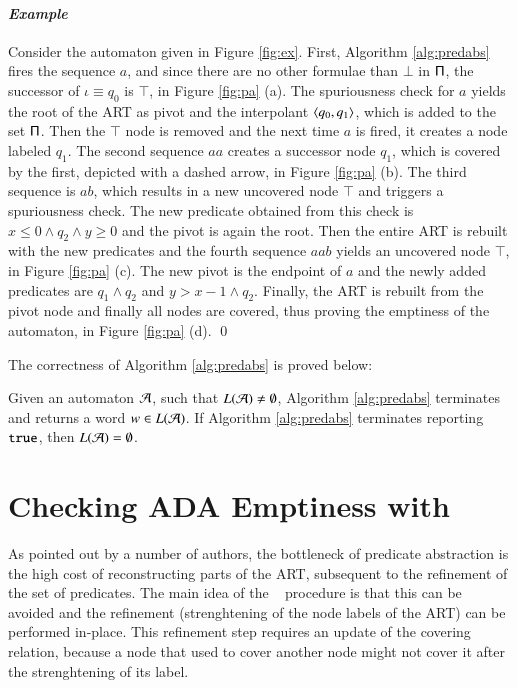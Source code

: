 \documentclass[10pt,conference,letterpaper,twocolumn]{IEEEtran}
\begin{document}
\paragraph{\em Example}
Consider the automaton given in Figure \ref{fig:ex}. First, Algorithm
\ref{alg:predabs} fires the sequence $a$, and since there are no other
formulae than $\bot$ in $\mathsf{\Pi}$, the successor of $\iota \equiv q_0$
is $\top$, in Figure \ref{fig:pa} (a). The spuriousness check for $a$
yields the root of the ART as pivot and the interpolant
$\left\langle q_0,q_1 \right\rangle$, which is added to the set $\mathsf{\Pi}$. Then the $\top$
node is removed and the next time $a$ is fired, it creates a node
labeled $q_1$. The second sequence $aa$ creates a successor node
$q_1$, which is covered by the first, depicted with a dashed arrow, in
Figure \ref{fig:pa} (b). The third sequence is $ab$, which results in
a new uncovered node $\top$ and triggers a spuriousness check. The new
predicate obtained from this check is $x\leq0\wedge q_2 \wedge y\geq0$
and the pivot is again the root. Then the entire ART is rebuilt with
the new predicates and the fourth sequence $aab$ yields an uncovered
node $\top$, in Figure \ref{fig:pa} (c). The new pivot is the endpoint
of $a$ and the newly added predicates are $q_1\wedge q_2$ and $y>x-1
\wedge q_2$. Finally, the ART is rebuilt from the pivot node and
finally all nodes are covered, thus proving the emptiness of the
automaton, in Figure \ref{fig:pa} (d). \qed

The correctness of Algorithm \ref{alg:predabs} is proved below:

\begin{theorem}\label{thm:predabs}
  Given an automaton $\mathcal{A}$, such that $L(\mathcal{A}) \neq \emptyset$, Algorithm
  \ref{alg:predabs} terminates and returns a word $w \in L(\mathcal{A})$. If
  Algorithm \ref{alg:predabs} terminates reporting $\mathtt{true}$, then
  $L(\mathcal{A}) = \emptyset$.
\end{theorem}

\section{Checking ADA Emptiness with \impact}

As pointed out by a number of authors, the bottleneck of predicate
abstraction is the high cost of reconstructing parts of the ART,
subsequent to the refinement of the set of predicates. The main idea
of the \impact~ procedure \cite{mcmillan06} is that this can be
avoided and the refinement (strenghtening of the node labels of the
ART) can be performed in-place. This refinement step requires an
update of the covering relation, because a node that used to cover
another node might not cover it after the strenghtening of its label.
\end{document}
